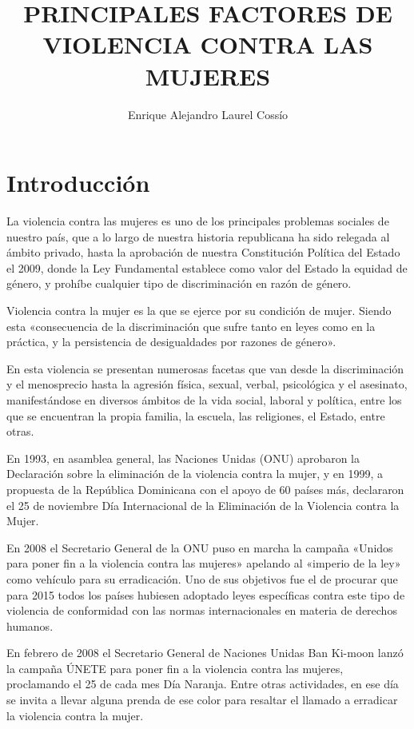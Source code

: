 \documentclass[11pt,letter]{article}
\title{{\Large \textbf{PRINCIPALES FACTORES DE VIOLENCIA CONTRA LAS MUJERES}}}
\author{ Enrique Alejandro Laurel Cossío}
\affil{Docente: Alvaro Limber Chirino Gutierrez\\Materia: Programación II\\ Universidad Mayor de San Andrés}
\begin{document}
\maketitle


\section{Introducción}
La violencia contra las mujeres es uno de los principales problemas sociales de nuestro país, que a lo largo de nuestra historia republicana ha sido relegada al ámbito privado, hasta la aprobación de nuestra Constitución Política del Estado el 2009, donde la Ley Fundamental
establece como valor del Estado la equidad de género, y prohíbe cualquier tipo de discriminación en razón de género.

Violencia contra la mujer es la que se ejerce por su condición de mujer. Siendo esta «consecuencia de la discriminación que sufre tanto en leyes como en la práctica, y la persistencia de desigualdades por razones de género».

En esta violencia se presentan numerosas facetas que van desde la discriminación y el menosprecio hasta la agresión física, sexual, verbal, psicológica y el asesinato, manifestándose en diversos ámbitos de la vida social, laboral y política, entre los que se encuentran la propia familia, la escuela, las religiones, el Estado, entre otras.

En 1993, en asamblea general, las Naciones Unidas (ONU) aprobaron la Declaración sobre la eliminación de la violencia contra la mujer, y en 1999, a propuesta de la República Dominicana con el apoyo de 60 países más, declararon el 25 de noviembre Día Internacional de la Eliminación de la Violencia contra la Mujer.

En 2008 el Secretario General de la ONU puso en marcha la campaña «Unidos para poner fin a la violencia contra las mujeres» apelando al «imperio de la ley» como vehículo para su erradicación. Uno de sus objetivos fue el de procurar que para 2015 todos los países hubiesen adoptado leyes específicas contra este tipo de violencia de conformidad con las normas internacionales en materia de derechos humanos.

En febrero de 2008 el Secretario General de Naciones Unidas Ban Ki-moon lanzó la campaña ÚNETE para poner fin a la violencia contra las mujeres, proclamando el 25 de cada mes Día Naranja. Entre otras actividades, en ese día se invita a llevar alguna prenda de ese color para resaltar el llamado a erradicar la violencia contra la mujer.
\end{document}
